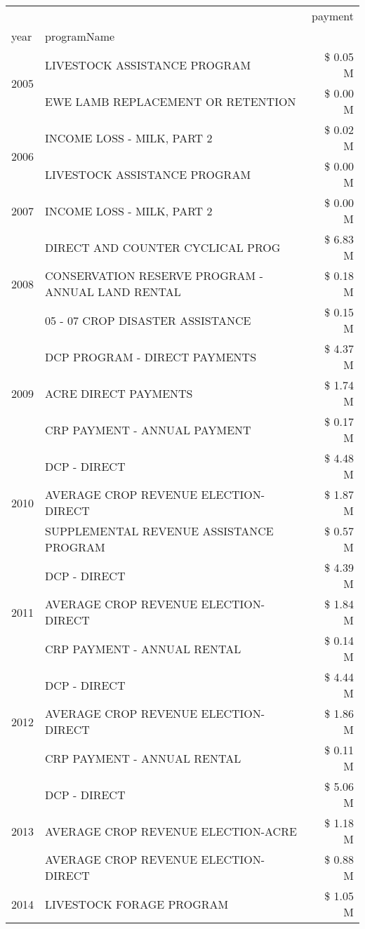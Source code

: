\begin{tabular}{llr}
\toprule
 &  & payment \\
year & programName &  \\
\midrule
\multirow[t]{2}{*}{2005} & LIVESTOCK ASSISTANCE PROGRAM & \$ 0.05 M \\
 & EWE LAMB REPLACEMENT OR RETENTION & \$ 0.00 M \\
\cline{1-3}
\multirow[t]{2}{*}{2006} & INCOME LOSS - MILK, PART 2 & \$ 0.02 M \\
 & LIVESTOCK ASSISTANCE PROGRAM & \$ 0.00 M \\
\cline{1-3}
2007 & INCOME LOSS - MILK, PART 2 & \$ 0.00 M \\
\cline{1-3}
\multirow[t]{3}{*}{2008} & DIRECT AND COUNTER CYCLICAL PROG & \$ 6.83 M \\
 & CONSERVATION RESERVE PROGRAM - ANNUAL LAND RENTAL & \$ 0.18 M \\
 & 05 - 07 CROP DISASTER ASSISTANCE & \$ 0.15 M \\
\cline{1-3}
\multirow[t]{3}{*}{2009} & DCP PROGRAM - DIRECT PAYMENTS & \$ 4.37 M \\
 & ACRE DIRECT PAYMENTS & \$ 1.74 M \\
 & CRP PAYMENT - ANNUAL PAYMENT & \$ 0.17 M \\
\cline{1-3}
\multirow[t]{3}{*}{2010} & DCP - DIRECT & \$ 4.48 M \\
 & AVERAGE CROP REVENUE ELECTION-DIRECT & \$ 1.87 M \\
 & SUPPLEMENTAL REVENUE ASSISTANCE PROGRAM & \$ 0.57 M \\
\cline{1-3}
\multirow[t]{3}{*}{2011} & DCP - DIRECT & \$ 4.39 M \\
 & AVERAGE CROP REVENUE ELECTION-DIRECT & \$ 1.84 M \\
 & CRP PAYMENT - ANNUAL RENTAL & \$ 0.14 M \\
\cline{1-3}
\multirow[t]{3}{*}{2012} & DCP - DIRECT & \$ 4.44 M \\
 & AVERAGE CROP REVENUE ELECTION-DIRECT & \$ 1.86 M \\
 & CRP PAYMENT - ANNUAL RENTAL & \$ 0.11 M \\
\cline{1-3}
\multirow[t]{3}{*}{2013} & DCP - DIRECT & \$ 5.06 M \\
 & AVERAGE CROP REVENUE ELECTION-ACRE & \$ 1.18 M \\
 & AVERAGE CROP REVENUE ELECTION-DIRECT & \$ 0.88 M \\
\cline{1-3}
\multirow[t]{3}{*}{2014} & LIVESTOCK FORAGE PROGRAM & \$ 1.05 M \\

\end{tabular}
